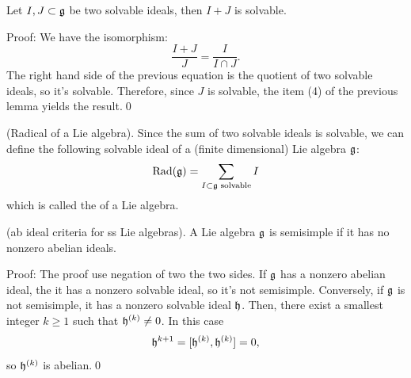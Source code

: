 \begin{dang}
    \begin{corollary}
        Let $I,J\subset \mathfrak{g}$ be two solvable ideals, then $I+J$ is solvable.
    \end{corollary}
\end{dang}
Proof: We have the isomorphism:
\begin{equation}
    \frac{I+J}{J}=\frac{I}{I\cap J}.
\end{equation}
The right hand side of the previous equation is the quotient of two solvable ideals, so it's solvable. Therefore, since
$J$ is  solvable, the item (4) of the previous lemma yields the result.\qed

\begin{dang}
    \begin{definition}
        (Radical of a Lie algebra).
        Since the sum of two solvable ideals is solvable, we can define the following solvable ideal of a (finite 
        dimensional) Lie algebra $\mathfrak{g}$:
        \begin{equation}
            \text{Rad}(\mathfrak{g})=\sum_{I\subset\mathfrak{g}\text{ solvable}} I
        \end{equation}
        which is called the  of a Lie algebra.
    \end{definition}
\end{dang}

\begin{dang}
    \begin{lemma}
        (ab ideal criteria for ss Lie algebras). A Lie algebra $\mathfrak{g}$ is semisimple if it has no nonzero abelian ideals.
    \end{lemma}
\end{dang}
Proof: The proof use negation of two the two sides. If $\mathfrak{g}$ has a nonzero abelian ideal, the it has a nonzero solvable
ideal, so it's not semisimple. Conversely, if $\mathfrak{g}$ is not semisimple, it has a nonzero solvable ideal $\mathfrak{h}$. Then, 
there exist a smallest integer $k\geq1$ such that $\mathfrak{h}^{(k)}\neq0$. In this case 
\begin{equation}
    \mathfrak{h}^{k+1}=[\mathfrak{h}^{(k)},\mathfrak{h}^{(k)}]=0,
\end{equation}
so $\mathfrak{h}^{(k)}$ is abelian.\qed

